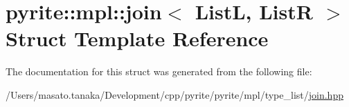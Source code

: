 \hypertarget{structpyrite_1_1mpl_1_1join}{}\section{pyrite\+:\+:mpl\+:\+:join$<$ ListL, ListR $>$ Struct Template Reference}
\label{structpyrite_1_1mpl_1_1join}


The documentation for this struct was generated from the following file\+:\begin{DoxyCompactItemize}
\item 
/\+Users/masato.\+tanaka/\+Development/cpp/pyrite/pyrite/mpl/type\+\_\+list/\mbox{\hyperlink{join_8hpp}{join.\+hpp}}\end{DoxyCompactItemize}
